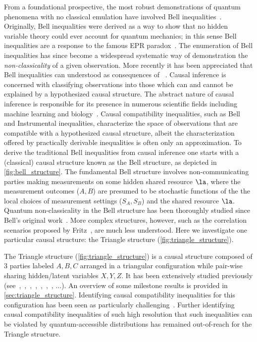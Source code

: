 \documentclass[aps, 10pt, english, twoside, pra, nofootinbib, tightenlines, longbibliography, superscriptaddress]{revtex4-1}
\begin{document}
    From a foundational prospective, the most robust demonstrations of quantum phenomena with no classical emulation have involved Bell inequalities~\cite{Bell_1964}. Originally, Bell inequalities were derived as a way to show that no hidden variable theory could ever account for quantum mechanics; in this sense Bell inequalities are a response to the famous EPR paradox~\cite{EPR_Orig}. The enumeration of Bell inequalities has since become a widespread systematic way of demonstration the \textit{non-classicality} of a given observation. More recently it has been appreciated that Bell inequalities can understood as consequences of ~\cite{Wood_2012}. Causal inference is concerned with classifying observations into those which can and cannot be explained by a hypothesized causal structure. The abstract nature of causal inference is responsible for its presence in numerous scientific fields including machine learning and biology~\cite{Pearl_2009,Pearl_2009_tr}. Causal compatibility inequalities, such as Bell and Instrumental inequalities, characterize the space of observations that are compatible with a hypothesized causal structure, albeit the characterization offered by practically derivable inequalities is often only an approximation. To derive the traditional Bell inequalities from causal inference one starts with a (classical) causal structure known as the Bell structure, as depicted in \cref{fig:bell_structure}. The fundamental Bell structure involves non-communicating parties making measurements on some hidden shared resource $\la$, where the measurement outcomes ($A, B$) are presumed to be stochastic functions of the the local choices of measurement settings ($S_A, S_B$) and the shared resource $\la$. Quantum non-classicality in the Bell structure has been thoroughly studied since Bell's original work~\cite{Brunner_2013}. More complex structures, however, such as the correlation scenarios proposed by Fritz~\cite{Fritz_2012,Fritz_2014}, are much less understood. Here we investigate one particular causal structure: the Triangle structure (\cref{fig:triangle_structure}).

    The Triangle structure (\cref{fig:triangle_structure}) is a causal structure composed of $3$ parties labeled $A, B, C$ arranged in a triangular configuration while pair-wise sharing hidden/latent variables $X, Y, Z$. It has been extensively studied previously (see~\cite[Fig. 1]{Steudel_2010},~\cite[Fig. 6]{Chaves_2014},~\cite[Fig. 8]{Branciard_2012},~\cite[Fig. 8, App. E]{Henson_2014},~\cite[Fig. 3]{Fritz_2012},~\cite[Fig. 4]{Weilenmann_2016},~\cite[Fig. 1]{Inflation}, $\ldots$). An overview of some milestone results is provided in \cref{sec:triangle_structure}. Identifying causal compatibility inequalities for this configuration has been seen as particularly challenging~\cite{Branciard_2012}. Further identifying causal compatibility inequalities of such high resolution that such inequalities can be violated by quantum-accessible distributions has remained out-of-reach for the Triangle structure.
\end{document}
